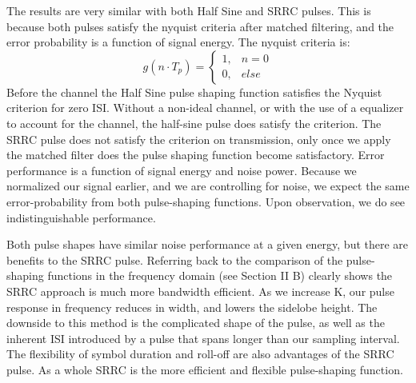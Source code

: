 The results are very similar with both Half Sine and SRRC pulses. This is because both pulses satisfy the nyquist criteria after matched filtering, and the error probability is a function of signal energy. The nyquist criteria is:
\[ g(n \cdot T_p) = \begin{cases}
						1, & n = 0 \\
						0, & else
					\end{cases}
\]
Before the channel the Half Sine pulse shaping function satisfies the Nyquist criterion for zero ISI. Without a non-ideal channel, or with the use of a equalizer to account for the channel, the half-sine pulse does satisfy the criterion. The SRRC pulse does not satisfy the criterion on transmission, only once we apply the matched filter does the pulse shaping function become satisfactory. Error performance is a function of signal energy and noise power. Because we normalized our signal earlier, and we are controlling for noise, we expect the same error-probability from both pulse-shaping functions. Upon observation, we do see indistinguishable performance. 

Both pulse shapes have similar noise performance at a given energy, but there are benefits to the SRRC pulse. Referring back to the comparison of the pulse-shaping functions in the frequency domain (see Section II B) clearly shows the SRRC approach is much more bandwidth efficient. As we increase K, our pulse response in frequency reduces in width, and lowers the sidelobe height. The downside to this method is the complicated shape of the pulse, as well as the inherent ISI introduced by a pulse that spans longer than our sampling interval. The flexibility of symbol duration and roll-off are also advantages of the SRRC pulse. As a whole SRRC is the more efficient and flexible pulse-shaping function. 

